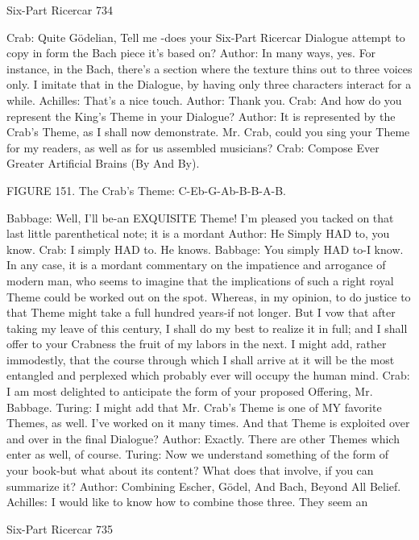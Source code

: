 Six-Part Ricercar                                                                       734

Crab: Quite Gödelian, Tell me -does your Six-Part Ricercar Dialogue attempt to copy in
  form the Bach piece it's based on?
Author: In many ways, yes. For instance, in the Bach, there's a section where the texture
  thins out to three voices only. I imitate that in the
Dialogue, by having only three characters interact for a while. Achilles: That's a nice
  touch.
Author: Thank you.
Crab: And how do you represent the King's Theme in your Dialogue?
Author: It is represented by the Crab's Theme, as I shall now demonstrate. Mr. Crab,
  could you sing your Theme for my readers, as well as for us assembled musicians?
Crab: Compose Ever Greater Artificial Brains (By And By).




                 FIGURE 151. The Crab's Theme: C-Eb-G-Ab-B-B-A-B.

Babbage: Well, I'll be-an EXQUISITE Theme! I'm pleased you tacked on that last little
  parenthetical note; it is a mordant Author: He Simply HAD to, you know.
Crab: I simply HAD to. He knows.
Babbage: You simply HAD to-I know. In any case, it is a mordant commentary on the
  impatience and arrogance of modern man, who seems to imagine that the implications
  of such a right royal Theme could be worked out on the spot. Whereas, in my opinion,
  to do justice to that Theme might take a full hundred years-if not longer. But I vow
  that after taking my leave of this century, I shall do my best to realize it in full; and I
  shall offer to your Crabness the fruit of my labors in the next. I might add, rather
  immodestly, that the course through which I shall arrive at it will be the most
  entangled and perplexed which probably ever will occupy the human mind.
Crab: I am most delighted to anticipate the form of your proposed Offering, Mr.
  Babbage.
Turing: I might add that Mr. Crab's Theme is one of MY favorite Themes, as well. I've
  worked on it many times. And that Theme is exploited over and over in the final
  Dialogue?
Author: Exactly. There are other Themes which enter as well, of course. Turing: Now we
  understand something of the form of your book-but what about its content? What does
  that involve, if you can summarize it?
Author: Combining Escher, Gödel, And Bach, Beyond All Belief. Achilles: I would like
  to know how to combine those three. They seem an




Six-Part Ricercar                                                                        735

